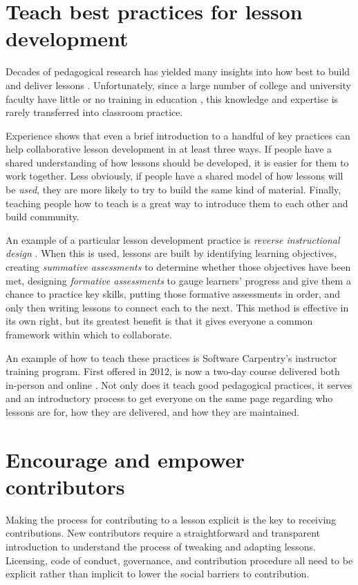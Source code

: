 \documentclass[10pt,letterpaper]{article}
\newcommand{\rulemajor}[1]{\section{#1}}
\begin{document}
\rulemajor{Teach best practices for lesson development}

Decades of pedagogical research has yielded many insights into
how best to build and deliver lessons \cite{hlw}.
Unfortunately,
since a large number of college and university faculty have little or no training in education \cite{browning2012},
this knowledge and expertise is rarely transferred into classroom practice.

Experience shows that even a brief introduction to a handful of key practices
can help collaborative lesson development in at least three ways.
If people have a shared understanding of how lessons should be developed,
it is easier for them to work together.
Less obviously,
if people have a shared model of how lessons will be \emph{used},
they are more likely to try to build the same kind of material.
Finally,
teaching people how to teach is a great way to introduce them to each other and build community.

An example of a particular lesson development practice is \emph{reverse instructional design}
\cite{wiggins-mctighe}.
When this is used,
lessons are built by
identifying learning objectives,
creating \emph{summative assessments} to determine whether those objectives have been met,
designing \emph{formative assessments} to gauge learners' progress
and give them a chance to practice key skills,
putting those formative assessments in order,
and only then writing lessons to connect each to the next.
This method is effective in its own right,
but its greatest benefit is that it gives everyone a common framework
within which to collaborate.

An example of how to teach these practices is Software Carpentry's instructor training program.
First offered in 2012,
is now a two-day course delivered both in-person and online
\cite{lessons-learned,instructor-training,how-to-teach-programming}.
Not only does it teach good pedagogical practices,
it serves and an introductory process to get everyone on the same page
regarding who lessons are for,
how they are delivered,
and how they are maintained.

\rulemajor{Encourage and empower contributors}

Making the process for contributing to a lesson explicit is
the key to receiving contributions.
New contributors require a straightforward and transparent introduction
to understand the process of tweaking and adapting lessons.
Licensing, code of conduct, governance, and contribution procedure
all need to be explicit rather than implicit
to lower the social barriers to contribution.
\end{document}
